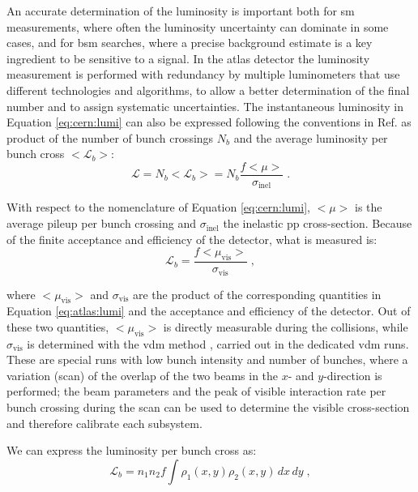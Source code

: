 An accurate determination of the luminosity is important both for \gls{sm} measurements, where often the luminosity uncertainty can dominate in some cases, and for \gls{bsm} searches, where a precise background estimate is a key ingredient to be sensitive to a signal. In the \gls{atlas} detector the luminosity measurement is performed with redundancy by multiple luminometers that use different technologies and algorithms, to allow a better determination of the final number and to assign systematic uncertainties. The instantaneous luminosity in Equation \ref{eq:cern:lumi} can also be expressed following the conventions in Ref. \cite{Aaboud:2016hhf} as product of the number of bunch crossings $N_b$ and the average luminosity per bunch cross ${<}\mathcal{L}_b{>}$:
\begin{equation}
\mathcal{L} = N_b {<}\mathcal{L}_b{>} = N_b \frac{f {<}\mu{>}}{\sigma_{\mathrm{inel}} } \; .
\label{eq:atlas:lumi}
\end{equation}

With respect to the nomenclature of Equation \ref{eq:cern:lumi}, ${<}\mu{>}$ is the average pileup per bunch crossing and $\sigma_{\mathrm{inel}}$ the inelastic \gls{pp} cross-section. Because of the finite acceptance and efficiency of the detector, what is measured is:
\begin{equation}
\mathcal{L}_b = \frac{f {<}\mu_\mathrm{vis}{>}}{\sigma_{\mathrm{vis}} } \; , \nonumber
\end{equation}

\noindent where ${<}\mu_\mathrm{vis}{>}$ and $\sigma_{\mathrm{vis}}$ are the product of the corresponding quantities in Equation \ref{eq:atlas:lumi} and the acceptance and efficiency of the detector. Out of these two quantities, ${<}\mu_\mathrm{vis}{>}$ is directly measurable during the collisions, while $\sigma_{\mathrm{vis}}$ is determined with the \gls{vdm} method \cite{vanderMeer:296752}, carried out in the dedicated \gls{vdm} runs. These are special runs with low bunch intensity and number of bunches, where a variation (scan) of the overlap of the two beams in the $x$- and $y$-direction is performed; the beam parameters and the peak of visible interaction rate per bunch crossing during the scan can be used to determine the visible cross-section and therefore calibrate each subsystem. 

We can express the luminosity per bunch cross as:
\begin{equation}
\mathcal{L}_b = n_1 n_2 f \int \rho_1(x,y) \rho_2(x,y) \, dx \, dy \; ,
\label{eq:lumi_vdm1}
\end{equation}

